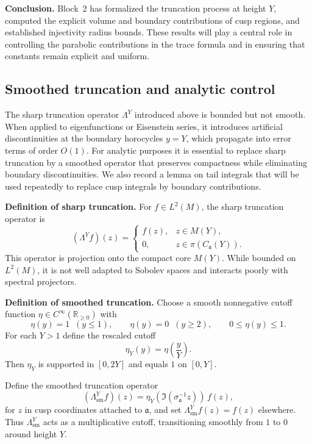 \medskip
\noindent
\textbf{Conclusion.}
Block~2 has formalized the truncation process at height $Y$,
computed the explicit volume and boundary contributions of cusp regions,
and established injectivity radius bounds.
These results will play a central role in controlling
the parabolic contributions in the trace formula
and in ensuring that constants remain explicit and uniform.


\subsection{Smoothed truncation and analytic control}

The sharp truncation operator $\Lambda^{Y}$ introduced above is bounded
but not smooth.  
When applied to eigenfunctions or Eisenstein series, it introduces
artificial discontinuities at the boundary horocycles $y=Y$,
which propagate into error terms of order $O(1)$.
For analytic purposes it is essential to replace sharp truncation by
a smoothed operator that preserves compactness while eliminating
boundary discontinuities.  
We also record a lemma on tail integrals that will be used repeatedly
to replace cusp integrals by boundary contributions.

\medskip
\noindent
\textbf{Definition of sharp truncation.}
For $f \in L^{2}(M)$, the sharp truncation operator is
\[
  (\Lambda^{Y} f)(z) =
  \begin{cases}
    f(z), & z \in M(Y), \\
    0, & z \in \pi(C_{\mathfrak{a}}(Y)).
  \end{cases}
\]
This operator is projection onto the compact core $M(Y)$.
While bounded on $L^{2}(M)$, it is not well adapted to Sobolev spaces
and interacts poorly with spectral projectors.

\medskip
\noindent
\textbf{Definition of smoothed truncation.}
Choose a smooth nonnegative cutoff function
$\eta \in C^{\infty}(\mathbb{R}_{\ge0})$ with
\[
  \eta(y) = 1 \;\; (y \le 1), \qquad
  \eta(y) = 0 \;\; (y \ge 2), \qquad
  0 \le \eta(y) \le 1.
\]
For each $Y>1$ define the rescaled cutoff
\[
  \eta_{Y}(y) = \eta\!\left(\frac{y}{Y}\right).
\]
Then $\eta_{Y}$ is supported in $[0,2Y]$ and equals $1$ on $[0,Y]$.

\medskip
\noindent
Define the smoothed truncation operator
\[
  (\Lambda^{Y}_{\mathrm{sm}} f)(z)
  = \eta_{Y}(\Im(\sigma_{\mathfrak{a}}^{-1} z)) \, f(z),
\]
for $z$ in cusp coordinates attached to $\mathfrak{a}$,
and set $\Lambda^{Y}_{\mathrm{sm}} f(z)=f(z)$ elsewhere.
Thus $\Lambda^{Y}_{\mathrm{sm}}$ acts as a multiplicative cutoff,
transitioning smoothly from $1$ to $0$ around height $Y$.

